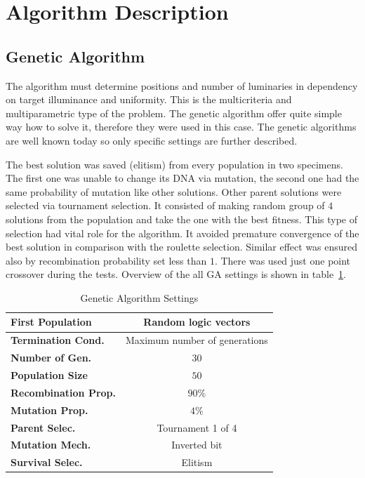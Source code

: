 \section{Algorithm Description}
\subsection{Genetic Algorithm}
\label{ssec:GenAlg}
The algorithm must determine positions and number of luminaries in dependency on target illuminance and uniformity. This is the multicriteria and multiparametric type of the problem. The genetic algorithm offer quite simple way how to solve it, therefore they were used in this case. The genetic algorithms are well known today so only specific settings are further described.

The best solution was saved (elitism) from every population in two specimens. The first one was unable to change its DNA via mutation, the second one had the same probability of mutation like other solutions. Other parent solutions were selected via tournament selection. It consisted of making random group of $4$ solutions from the population and take the one with the best fitness. This type of selection had vital role for the algorithm. It avoided premature convergence of the best solution in comparison with the roulette selection. Similar effect was ensured also by recombination probability set less than $1$. There was used just one point crossover during the tests. Overview of the all GA settings is shown in table~\ref{tab:GAsettings}.

\begin{table}[htb]
	\renewcommand{\arraystretch}{1.3}
	\caption{Genetic Algorithm Settings}
 	\label{tab:GAsettings}
	\centering
  \begin{tabular}{| l | c |}
    \hline
    \textbf{First Population} & Random logic vectors \\
    \hline
    \textbf{Termination Cond.} & Maximum number of generations \\
    \hline
		\textbf{Number of Gen.} & $30$ \\
    \hline
		\textbf{Population Size} & $50$ \\
    \hline
		\textbf{Recombination Prop.} & $90 \%$ \\
    \hline
		\textbf{Mutation Prop.} & $4 \%$ \\
    \hline
		\textbf{Parent Selec.} & Tournament 1 of 4 \\
    \hline
		\textbf{Mutation Mech.} & Inverted bit \\
    \hline
		\textbf{Survival Selec.} & Elitism \\
    \hline
  \end{tabular}
\end{table}

